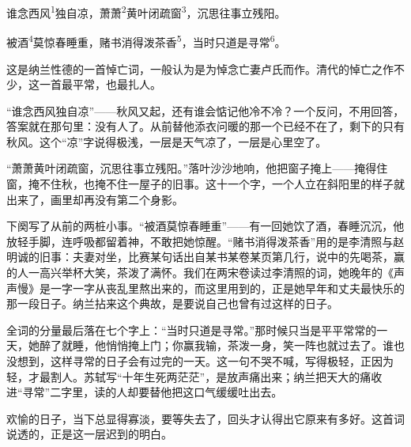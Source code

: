 
\begin{poem}
谁念西风\textsuperscript{1}独自凉，萧萧\textsuperscript{2}黄叶闭疏窗\textsuperscript{3}，沉思往事立残阳。

被酒\textsuperscript{4}莫惊春睡重，赌书消得泼茶香\textsuperscript{5}，当时只道是寻常\textsuperscript{6}。
\end{poem}

\begin{annotations}
\end{annotations}

\begin{appreciation}
这是纳兰性德的一首悼亡词，一般认为是为悼念亡妻卢氏而作。清代的悼亡之作不少，这一首最平常，也最扎人。

“谁念西风独自凉”——秋风又起，还有谁会惦记他冷不冷？一个反问，不用回答，答案就在那句里：没有人了。从前替他添衣问暖的那一个已经不在了，剩下的只有秋风。这个“凉”字说得极浅，一层是天气凉了，一层是心里空了。

“萧萧黄叶闭疏窗，沉思往事立残阳。”落叶沙沙地响，他把窗子掩上——掩得住窗，掩不住秋，也掩不住一屋子的旧事。这十一个字，一个人立在斜阳里的样子就出来了，画里却再没有第二个身影。

下阕写了从前的两桩小事。“被酒莫惊春睡重”——有一回她饮了酒，春睡沉沉，他放轻手脚，连呼吸都留着神，不敢把她惊醒。“赌书消得泼茶香”用的是李清照与赵明诚的旧事：夫妻对坐，比赛某句话出自某书某卷某页第几行，说中的先喝茶，赢的人一高兴举杯大笑，茶泼了满怀。我们在两宋卷读过李清照的词，她晚年的《声声慢》是一字一字从丧乱里熬出来的，而这里用到的，正是她早年和丈夫最快乐的那一段日子。纳兰拈来这个典故，是要说自己也曾有过这样的日子。

全词的分量最后落在七个字上：“当时只道是寻常。”那时候只当是平平常常的一天，她醉了就睡，他悄悄掩上门；你赢我输，茶泼一身，笑一阵也就过去了。谁也没想到，这样寻常的日子会有过完的一天。这一句不哭不喊，写得极轻，正因为轻，才最割人。苏轼写“十年生死两茫茫”，是放声痛出来；纳兰把天大的痛收进“寻常”二字里，读的人却要替他把这口气缓缓吐出去。

欢愉的日子，当下总显得寡淡，要等失去了，回头才认得出它原来有多好。这首词说透的，正是这一层迟到的明白。
\end{appreciation}
